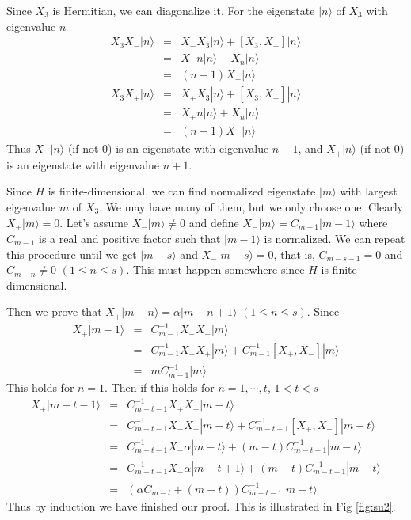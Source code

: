\documentclass[12pt]{book}
\begin{document}
	Since $X_3$ is Hermitian, we can diagonalize it. For the eigenstate $|n\rangle$ of $X_3$ with eigenvalue $n$
	\begin{eqnarray}
		X_3X_-|n\rangle&=&X_-X_3|n\rangle+[X_3,X_-]|n\rangle\\
		&=&X_-n|n\rangle-X_n|n\rangle\\
		&=&(n-1)X_-|n\rangle\\
		X_3X_+|n\rangle&=&X_+X_3|n\rangle+[X_3,X_+]|n\rangle\\
		&=&X_+n|n\rangle+X_n|n\rangle\\
		&=&(n+1)X_+|n\rangle
	\end{eqnarray} 
	Thus $X_-|n\rangle$ (if not 0) is an eigenstate with eigenvalue $n-1$, and $X_+|n\rangle$ (if not 0) is an eigenstate with eigenvalue $n+1$.
	
	Since $H$ is finite-dimensional, we can find normalized eigenstate $|m\rangle$ with largest eigenvalue $m$ of $X_3$. We may have many of them, but we only choose one. Clearly $X_+|m\rangle=0$. Let's assume $X_-|m\rangle\neq 0$ and define $X_-|m\rangle=C_{m-1}|m-1\rangle$ where $C_{m-1}$ is a real and positive factor such that $|m-1\rangle$ is normalized. We can repeat this procedure until we get $|m-s\rangle$ and $X_-|m-s\rangle=0$, that is, $C_{m-s-1}=0$ and $C_{m-n}\neq 0$ $(1\leq n\leq s)$. This must happen somewhere since $H$ is finite-dimensional.
	
	Then we prove that $X_+|m-n\rangle=\alpha|m-n+1\rangle$ $(1\leq n\leq s)$. Since
	\begin{eqnarray}
		X_+|m-1\rangle&=&C_{m-1}^{-1}X_+X_-|m\rangle\\
		&=&C_{m-1}^{-1}X_-X_+|m\rangle+C_{m-1}^{-1}[X_+,X_-]|m\rangle\\
		&=&mC_{m-1}^{-1}|m\rangle
	\end{eqnarray}
	This holds for $n=1$. Then if this holds for $n=1,\cdots,t$, $1<t<s$
	\begin{eqnarray}
		X_+|m-t-1\rangle&=&C_{m-t-1}^{-1}X_+X_-|m-t\rangle\\
		&=&C_{m-t-1}^{-1}X_-X_+|m-t\rangle+C_{m-t-1}^{-1}[X_+,X_-]|m-t\rangle\\
		&=&C_{m-t-1}^{-1}X_-\alpha|m-t\rangle+(m-t)C_{m-t-1}^{-1}|m-t\rangle\\
		&=&C_{m-t-1}^{-1}X_-\alpha|m-t+1\rangle+(m-t)C_{m-t-1}^{-1}|m-t\rangle\\
		&=&(\alpha C_{m-t}+(m-t))C_{m-t-1}^{-1}|m-t\rangle
	\end{eqnarray}
	Thus by induction we have finished our proof. This is illustrated in Fig \ref{fig:su2}.
	
\end{document}
